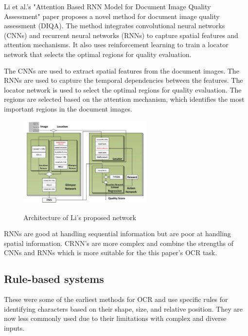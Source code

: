 Li et al.'s "Attention Based RNN Model for Document Image Quality Assessment" paper proposes a novel method for document image quality assessment (DIQA). The method integrates convolutional neural networks (CNNs) and recurrent neural networks (RNNs) to capture spatial features and attention mechanisms. It also uses reinforcement learning to train a locator network that selects the optimal regions for quality evaluation.

The CNNs are used to extract spatial features from the document images. The RNNs are used to capture the temporal dependencies between the features. The locator network is used to select the optimal regions for quality evaluation. The regions are selected based on the attention mechanism, which identifies the most important regions in the document images. \cite{liAttentionBasedRNN2017}


\begin{figure}[ht]
    \centering
    \includegraphics[width=0.6\textwidth]{Figures/AT_Li.jpg}
    \caption[Architecture of Li's proposed network]{Architecture of Li's proposed network}\cite{liAttentionBasedRNN2017}
    \label{fig:Li's Proposed Architecture}
\end{figure}

RNNs are good at handling sequential information but are poor at handling spatial information. CRNN's are more complex and combine the strengths of CNNs and RNNs which is more suitable for the this paper's OCR task.



\newpage

\subsection{Rule-based systems}

These were some of the earliest methods for OCR and use specific rules for identifying characters based on their shape, size, and relative position. They are now less commonly used due to their limitations with complex and diverse inputs.

